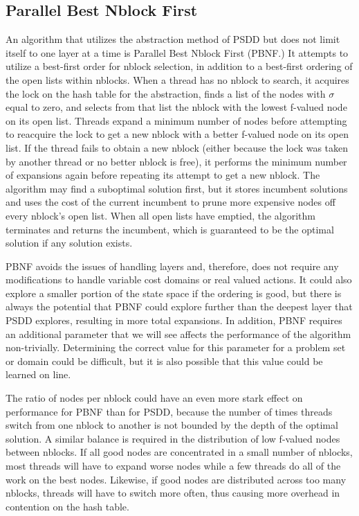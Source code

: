 \documentclass{article}
\begin{document}
\subsection{Parallel Best Nblock First}
An algorithm that utilizes the abstraction method of PSDD but does not limit itself to one layer at a time is Parallel Best Nblock First (PBNF.) It attempts to utilize a best-first order for nblock selection, in addition to a best-first ordering of the open lists within nblocks. When a thread has no nblock to search, it acquires the lock on the hash table for the abstraction, finds a list of the nodes with $\sigma$ equal to zero, and selects from that list the nblock with the lowest f-valued node on its open list. Threads expand a minimum number of nodes before attempting to reacquire the lock to get a new nblock with a better f-valued node on its open list. If the thread fails to obtain a new nblock (either because the lock was taken by another thread or no better nblock is free), it performs the minimum number of expansions again before repeating its attempt to get a new nblock. The algorithm may find a suboptimal solution first, but it stores incumbent solutions and uses the cost of the current incumbent to prune more expensive nodes off every nblock's open list. When all open lists have emptied, the algorithm terminates and returns the incumbent, which is guaranteed to be the optimal solution if any solution exists.

PBNF avoids the issues of handling layers and, therefore, does not require any modifications to handle variable cost domains or real valued actions. It could also explore a smaller portion of the state space if the ordering is good, but there is always the potential that PBNF could explore further than the deepest layer that PSDD explores, resulting in more total expansions. In addition, PBNF requires an additional parameter that we will see affects the performance of the algorithm non-trivially. Determining the correct value for this parameter for a problem set or domain could be difficult, but it is also possible that this value could be learned on line.

The ratio of nodes per nblock could have an even more stark effect on performance for PBNF than for PSDD, because the number of times threads switch from one nblock to another is not bounded by the depth of the optimal solution. A similar balance is required in the distribution of low f-valued nodes between nblocks. If all good nodes are concentrated in a small number of nblocks, most threads will have to expand worse nodes while a few threads do all of the work on the best nodes. Likewise, if good nodes are distributed across too many nblocks, threads will have to switch more often, thus causing more overhead in contention on the hash table.
\end{document}
